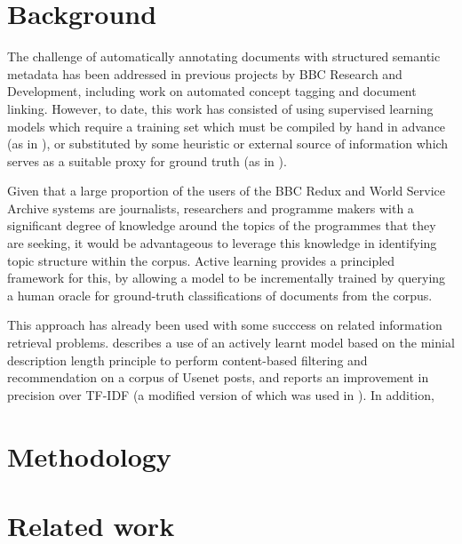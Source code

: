 \documentclass[a4paper, 11pt]{article}
\begin{document}
\section{Background}
The challenge of automatically annotating documents with structured semantic metadata has been addressed in previous projects by BBC Research and Development, including work on automated concept tagging and  document linking. However, to date, this work has consisted of using supervised learning models which require a training set which must be compiled by hand in advance (as in \cite{Raimond2013}), or substituted by some heuristic or external source of information which serves as a suitable proxy for ground truth (as in \cite{Raimond2012}).

Given that a large proportion of the users of the BBC Redux and World Service Archive systems are journalists, researchers and programme makers with a significant degree of knowledge around the topics of the programmes that they are seeking, it would be advantageous to leverage this knowledge in identifying topic structure within the corpus. Active learning provides a principled framework for this, by allowing a model to be incrementally trained by querying a human oracle for ground-truth classifications of documents from the corpus.

This approach has already been used with some succcess on related information retrieval problems. \cite{Lang1995} describes a use of an actively learnt model based on the minial description length principle to perform content-based filtering and recommendation on a corpus of Usenet posts, and reports an improvement in precision over TF-IDF (a modified version of which was used in \cite{Raimond2012}). In addition, \cite{MacCallum1998}
\section{Methodology}
\label{sec:Methodology}
\section{Related work}
\label{sec:Related work}
\printbibliography
\end{document}
